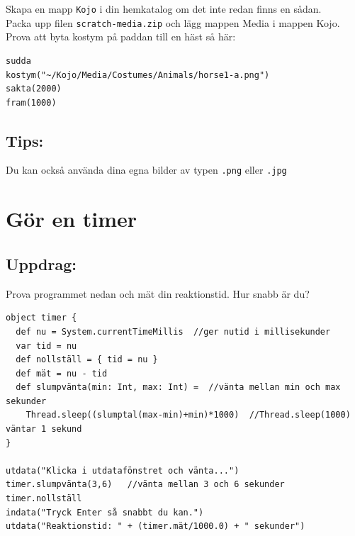 Skapa en mapp \lstinline{Kojo} i din hemkatalog om det inte redan finns en sådan.\\
Packa upp filen \lstinline{scratch-media.zip} och lägg mappen Media i mappen Kojo.\\
Prova att byta kostym på paddan till en häst så här:

  

\begin{lstlisting}[basicstyle={\ttfamily\fontsize{20}{24}\selectfont},numbers=none]
sudda
kostym("~/Kojo/Media/Costumes/Animals/horse1-a.png")
sakta(2000)
fram(1000)
\end{lstlisting}
        
\section*{\color{OliveGreen}Tips:}
Du kan också använda dina egna bilder av typen \lstinline{.png} eller \lstinline{.jpg}
\chapter{Gör en timer}\section*{\color{BrickRed}Uppdrag:}
Prova programmet nedan och mät din reaktionstid. Hur snabb är du?

\begin{lstlisting}[basicstyle={\ttfamily\fontsize{18}{22}\selectfont},numbers=none]
object timer {
  def nu = System.currentTimeMillis  //ger nutid i millisekunder
  var tid = nu
  def nollställ = { tid = nu }
  def mät = nu - tid
  def slumpvänta(min: Int, max: Int) =  //vänta mellan min och max sekunder
    Thread.sleep((slumptal(max-min)+min)*1000)  //Thread.sleep(1000) väntar 1 sekund
}

utdata("Klicka i utdatafönstret och vänta...")
timer.slumpvänta(3,6)   //vänta mellan 3 och 6 sekunder
timer.nollställ
indata("Tryck Enter så snabbt du kan.")
utdata("Reaktionstid: " + (timer.mät/1000.0) + " sekunder")
\end{lstlisting}
        
